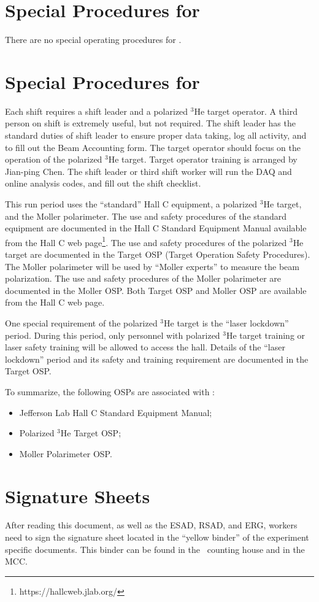 %
\newpage
\section{Special Procedures for \HALL}

There are no special operating procedures for \HALL{}.

%
\newpage
\section{Special Procedures for \EXPTS}\label{app:exp_req}

Each shift requires a shift leader and a polarized $^3$He target operator.
A third person on shift is extremely useful, but not required. The shift leader 
has the standard
duties of shift leader to ensure proper data taking, log all activity, and to fill out
the Beam Accounting form. The target operator should focus on the 
operation of the polarized $^3$He target. Target operator training is arranged by
Jian-ping Chen. The shift leader or third
shift worker will run the DAQ and online analysis codes, and fill out the shift checklist. 

This run period uses the ``standard'' Hall C equipment, 
a polarized $^3$He target, and the Moller polarimeter.
The use and safety procedures of the standard equipment are documented
in the Hall C Standard Equipment
Manual available from the Hall C web page\footnote{https://hallcweb.jlab.org/}.
The use and safety procedures of the polarized $^3$He target are 
documented in the Target OSP (Target Operation Safety Procedures). 
The Moller polarimeter will be used by ``Moller experts'' to measure the beam
polarization.
The use and safety procedures of the Moller polarimeter are
documented in the Moller OSP.
Both Target OSP and Moller OSP are available from the Hall C web page.

One special requirement of the polarized $^3$He target is the ``laser lockdown''
period. During this period, only personnel with polarized $^3$He target training or
laser safety training will be allowed
to access the hall. Details of the ``laser lockdown'' period and its safety and training
requirement are documented in the Target OSP.

To summarize, the following OSPs are associated with \EXPTS:
\begin{itemize}
 \item Jefferson Lab Hall C Standard Equipment Manual;
 \item Polarized $^3$He Target OSP;
 \item Moller Polarimeter OSP.
\end{itemize}

\newpage
\section{Signature Sheets}

After reading this document, as well as the ESAD, RSAD, and ERG, workers need to sign
the signature sheet located in the ``yellow binder'' of the experiment specific documents.
This binder can be found in the \HALL\ counting house and in the MCC.

